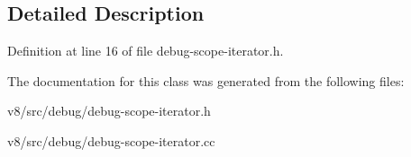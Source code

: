\subsection{Detailed Description}


Definition at line 16 of file debug-\/scope-\/iterator.\+h.



The documentation for this class was generated from the following files\+:\begin{DoxyCompactItemize}
\item 
v8/src/debug/debug-\/scope-\/iterator.\+h\item 
v8/src/debug/debug-\/scope-\/iterator.\+cc\end{DoxyCompactItemize}
